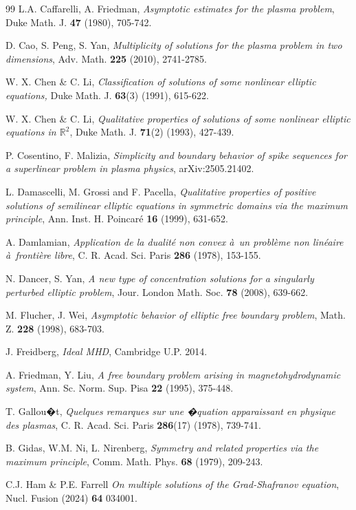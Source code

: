 \documentclass[10pt]{amsart}
\newcommand{\R}{\mathbb{R}}
\def\R{\mathbb{R}}
\def\ee{\`e}
\def\aa{\`a}
\begin{document}
\begin{thebibliography}{99}
 L.A. Caffarelli, A. Friedman, {\em  Asymptotic estimates for the plasma problem},
Duke Math. J. {\bf 47} (1980), 705-742.

 D. Cao, S. Peng, S. Yan,  {\em Multiplicity of solutions for the plasma problem
in two dimensions}, Adv. Math. {\bf 225} (2010), 2741-2785.

 W. X. Chen \& C. Li, {\em Classification of solutions of some nonlinear elliptic equations,}
Duke Math. J.  {\bf 63}(3) (1991), 615-622.

 W. X. Chen \& C. Li, {\em Qualitative properties of solutions of
some nonlinear elliptic equations in $\R^2$}, Duke Math. J. {\bf 71}(2) (1993), 427-439.

 P. Cosentino, F. Malizia, {\em Simplicity and boundary behavior of spike sequences for a
superlinear problem in plasma physics},  	arXiv:2505.21402.

 L. Damascelli, M. Grossi and F. Pacella, {\em Qualitative properties of positive
solutions of semilinear elliptic equations in symmetric domains via the maximum
principle}, Ann. Inst. H. Poincar\'e  {\bf 16} (1999), 631-652.

 A. Damlamian, {\em Application de la dualit\'e non convex \aa\, un probl\ee me non lin\'eaire \aa\,
fronti\ee re libre}, C. R. Acad. Sci. Paris {\bf 286} (1978), 153-155.

 N. Dancer, S. Yan, {\em A new type of concentration solutions
for a singularly perturbed elliptic problem}, Jour. London Math. Soc. {\bf 78} (2008), 639-662.

 M. Flucher, J. Wei, {\em Asymptotic behavior of elliptic free boundary problem},
Math. Z. {\bf 228} (1998), 683-703.

 J. Freidberg, {\sl Ideal MHD}, Cambridge U.P. 2014.

 A. Friedman, Y. Liu, {\em A free boundary problem arising in magnetohydrodynamic system},
Ann. Sc. Norm. Sup. Pisa {\bf 22} (1995), 375-448.

 T. Gallou�t, {\em Quelques remarques sur une �quation apparaissant en physique des plasmas},
C. R. Acad. Sci. Paris {\bf 286}(17) (1978), 739-741.

 B. Gidas, W.M. Ni, L. Nirenberg, {\it Symmetry and related
properties via the maximum principle}, Comm. Math. Phys. {\bf 68} (1979),
209-243.

 C.J. Ham \& P.E. Farrell  {\em On multiple solutions of the Grad-Shafranov
equation}, Nucl. Fusion (2024) {\bf 64} 034001.


\end{thebibliography}
\end{document}
